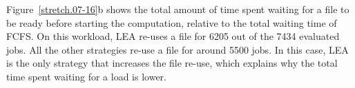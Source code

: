 \documentclass[conference,10pt]{IEEEtran}
\begin{document}

Figure~\ref{stretch.07-16}b
shows the total amount of time spent 
waiting for a file to be ready before starting the computation,
relative to the total waiting time of FCFS.
On this workload, LEA re-uses a file for 6205 out of the 7434 evaluated jobs.
All the other strategies re-use a file for around 5500 jobs.
In this case, LEA is the only strategy that increases the
file re-use, which explains why the total time spent waiting for a load is lower.
\end{document}
